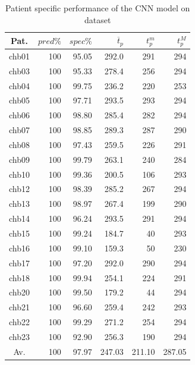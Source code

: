 \begin{table}[ht]
    \centering
    \begin{tabular}{c|rrrrr}
    Pat.  & $pred\%$ & $spec\%$ & $\overline{t}_p$   & $t_p^m$  & $t_p^M$   \\ \hline
    chb01 & 100    & 95.05  & 292.0  & 291    & 294    \\
    chb03 & 100    & 95.33  & 278.4  & 256    & 294    \\
    chb04 & 100    & 99.75  & 236.2  & 220    & 253    \\
    chb05 & 100    & 97.71  & 293.5  & 293    & 294    \\
    chb06 & 100    & 98.80  & 285.4  & 282    & 294    \\
    chb07 & 100    & 98.85  & 289.3  & 287    & 290    \\
    chb08 & 100    & 97.43  & 259.5  & 226    & 291    \\
    chb09 & 100    & 99.79  & 263.1 & 240    & 284    \\
    chb10 & 100    & 99.36  & 200.5  & 106    & 293    \\
    chb12 & 100    & 98.39  & 285.2  & 267    & 294    \\
    chb13 & 100    & 98.97  & 267.4  & 199    & 290    \\
    chb14 & 100    & 96.24  & 293.5  & 291    & 294    \\
    chb15 & 100    & 99.24  & 184.7  & 40     & 293    \\
    chb16 & 100    & 99.10  & 159.3  & 50     & 230    \\
    chb17 & 100    & 97.20  & 292.0  & 290    & 294    \\
    chb18 & 100    & 99.94  & 254.1  & 224    & 291    \\
    chb20 & 100    & 99.50  & 179.2  & 44     & 294    \\
    chb21 & 100    & 96.60  & 259.4  & 242    & 293    \\
    chb22 & 100    & 99.29  & 271.2  & 254    & 294    \\
    chb23 & 100    & 92.90  & 256.3  & 190    & 294    \\ \hline
    Av.   & 100    & 97.97  & 247.03 & 211.10 & 287.05 \\ \hline
    \end{tabular}
    \caption{Patient specific performance of the \gls{CNN} model on  dataset}
    \label{tab:cnn-results-specific} 
\end{table}

